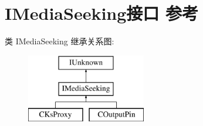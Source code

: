 \hypertarget{interface_i_media_seeking}{}\section{I\+Media\+Seeking接口 参考}
\label{interface_i_media_seeking}
类 I\+Media\+Seeking 继承关系图\+:\begin{figure}[H]
\begin{center}
\leavevmode
\includegraphics[height=3.000000cm]{interface_i_media_seeking}
\end{center}
\end{figure}
